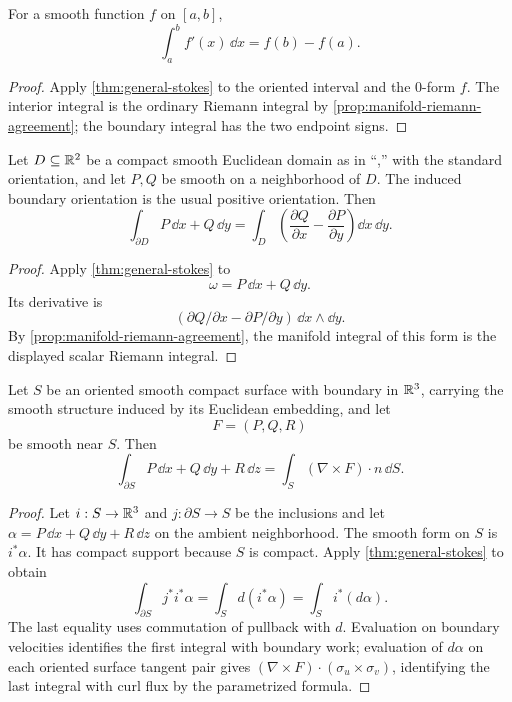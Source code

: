 \begin{corollary}
For a smooth function $f$ on $[a,b]$,
\[
\int_a^b f'(x)\,\dd x=f(b)-f(a).
\]
\end{corollary}
\begin{proof}
Apply \cref{thm:general-stokes} to the oriented interval and the
$0$-form $f$. The interior integral is the ordinary Riemann integral
by \cref{prop:manifold-riemann-agreement}; the boundary integral has the
two endpoint signs.
\end{proof}

\begin{corollary}\label{cor:global-green}
Let $D\subseteq\mathbb{R}^2$ be a compact smooth Euclidean domain as in
``,'' with the standard orientation, and let $P,Q$ be smooth on a neighborhood of $D$. The induced
boundary orientation is the usual positive orientation. Then
\[
\int_{\partial D}P\,\dd x+Q\,\dd y
=
\int_D
\left(
\frac{\partial Q}{\partial x}
-
\frac{\partial P}{\partial y}
\right)\dd x\,\dd y.
\]
\end{corollary}
\begin{proof}
Apply \cref{thm:general-stokes} to
\[
\omega=P\,\dd x+Q\,\dd y.
\]
Its derivative is
\[
(\partial Q/\partial x-\partial P/\partial y)
\,\dd x\wedge\dd y.
\]
 By \cref{prop:manifold-riemann-agreement}, the
manifold integral of this form is the displayed scalar Riemann integral.
\end{proof}

\begin{corollary}
Let $S$ be an oriented smooth compact surface with boundary in $\mathbb{R}^3$,
carrying the smooth structure induced by its Euclidean embedding, and let
\[
F=(P,Q,R)
\]
be smooth near $S$.  Then
\[
\int_{\partial S}P\,\dd x+Q\,\dd y+R\,\dd z
=
\int_S(\nabla\times F)\cdot n\,\dd S.
\]
\end{corollary}
\begin{proof}
Let $i:S\to\mathbb{R}^3$ and $j:\partial S\to S$ be the inclusions and let
$\alpha=P\,\dd x+Q\,\dd y+R\,\dd z$ on the ambient neighborhood.
The smooth form on $S$ is $i^*\alpha$. It has compact support because
$S$ is compact. Apply \cref{thm:general-stokes} to obtain
\[
\int_{\partial S}j^*i^*\alpha
=\int_S d(i^*\alpha)=\int_S i^*(d\alpha).
\]
The last equality uses commutation of pullback with $d$. Evaluation on
boundary velocities identifies the first integral with boundary work;
evaluation of $d\alpha$ on each oriented surface tangent pair gives
$(\nabla\times F)\cdot(\sigma_u\times\sigma_v)$, identifying the last
integral with curl flux by the parametrized formula.
\end{proof}

